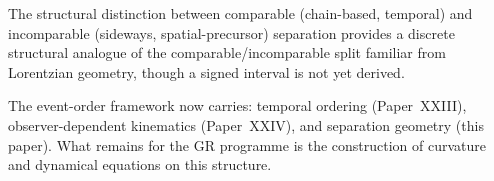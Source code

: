 \documentclass[12pt]{article}
\begin{document}
The structural distinction between comparable (chain-based, temporal) and incomparable (sideways, spatial-precursor) separation provides a discrete structural analogue of the comparable/incomparable split familiar from Lorentzian geometry, though a signed interval is not yet derived.

The event-order framework now carries: temporal ordering (Paper~XXIII), observer-dependent kinematics (Paper~XXIV), and separation geometry (this paper). What remains for the GR programme is the construction of curvature and dynamical equations on this structure.



\end{document}
